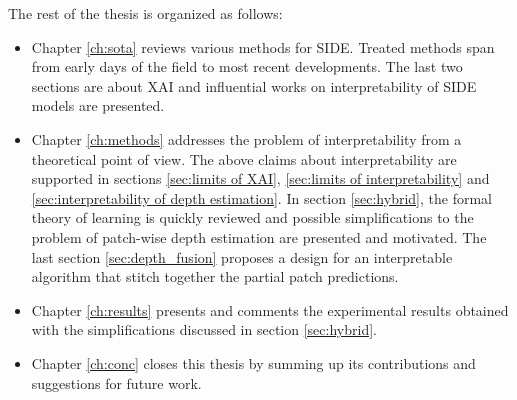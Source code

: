 The rest of the thesis is organized as follows:
\begin{itemize}
    \item{
        Chapter \ref{ch:sota} reviews various methods for SIDE.
        Treated methods span from early days of the field to most recent developments.
        The last two sections are about XAI and influential works on interpretability of SIDE models are presented.
    }
    \item{
        Chapter \ref{ch:methods} addresses the problem of interpretability from a theoretical point of view.
        The above claims about interpretability are supported in sections \ref{sec:limits of XAI}, \ref{sec:limits of interpretability} and \ref{sec:interpretability of depth estimation}.
        In section \ref{sec:hybrid}, the formal theory of learning is quickly reviewed and possible simplifications to the problem of patch-wise depth estimation are presented and motivated.
        The last section \ref{sec:depth_fusion} proposes a design for an interpretable algorithm that stitch together the partial patch predictions.
    }
    \item{
        Chapter \ref{ch:results} presents and comments the experimental results obtained with the simplifications discussed in section \ref{sec:hybrid}.
    }
    \item{
        Chapter \ref{ch:conc} closes this thesis by summing up its contributions and suggestions for future work.
    }
\end{itemize}
